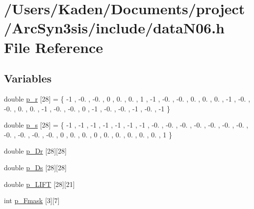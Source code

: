 \hypertarget{a00521}{}\section{/\+Users/\+Kaden/\+Documents/project/\+Arc\+Syn3sis/include/data\+N06.h File Reference}
\label{a00521}
\subsection*{Variables}
\begin{DoxyCompactItemize}
\item 
double \hyperlink{a00521_aceab829489526c4ccfde6857debc08e0}{p\+\_\+r} \mbox{[}28\mbox{]} = \{ -\/1 , -\/0. , -\/0. , 0 , 0. , 0. , 1 , -\/1 , -\/0. , -\/0. , 0. , 0. , 0. , -\/1 , -\/0. , -\/0. , 0. , 0. , -\/1 , -\/0. , -\/0. , 0 , -\/1 , -\/0. , -\/0. , -\/1 , -\/0. , -\/1 \}
\item 
double \hyperlink{a00521_a34fc3d2722a5f09058263abfc50c31a8}{p\+\_\+s} \mbox{[}28\mbox{]} = \{ -\/1 , -\/1 , -\/1 , -\/1 , -\/1 , -\/1 , -\/1 , -\/0. , -\/0. , -\/0. , -\/0. , -\/0. , -\/0. , -\/0. , -\/0. , -\/0. , -\/0. , -\/0. , 0 , 0. , 0. , 0 , 0. , 0. , 0. , 0. , 0. , 1 \}
\item 
double \hyperlink{a00521_a10d32d84835abfa5a43ca05bb5157623}{p\+\_\+\+Dr} \mbox{[}28\mbox{]}\mbox{[}28\mbox{]}
\item 
double \hyperlink{a00521_a12faa16cf926b3799b733b5da2993946}{p\+\_\+\+Ds} \mbox{[}28\mbox{]}\mbox{[}28\mbox{]}
\item 
double \hyperlink{a00521_a21d80bf79d58fbc86b7f27d5c4a7e305}{p\+\_\+\+L\+I\+FT} \mbox{[}28\mbox{]}\mbox{[}21\mbox{]}
\item 
int \hyperlink{a00521_a6b18ffc6e470dc9d5903792503239300}{p\+\_\+\+Fmask} \mbox{[}3\mbox{]}\mbox{[}7\mbox{]}
\end{DoxyCompactItemize}


